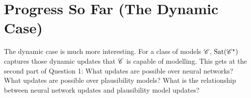 \documentclass[letterpaper]{article}
\begin{document}

\section*{Progress So Far (The Dynamic Case)}

The dynamic case is much more interesting.  For a class of models $\mathscr{C}$, $\mathrm{Sat}( \mathscr{C}^\star )$ captures those dynamic updates that $\mathscr{C}$ is capable of modelling.  This gets at the second part of Question 1: What updates are possible over neural networks?  What updates are possible over plausibility models?  What is the relationship between neural network updates and plausibility model updates?
\end{document}
